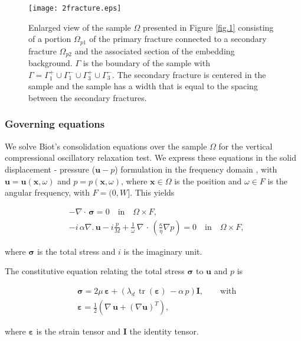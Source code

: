 \documentclass[draft]{agujournal2019}
\DeclareMathOperator{\tr}{tr}
\begin{document}
 \begin{figure}[!ht]
\centering
        \texttt{[image: 2fracture.eps]}
\caption{ Enlarged view of the sample $\Omega$ presented in Figure \ref{fig.1} consisting of a portion $\Omega_{p1}$ of the primary fracture connected to a secondary fracture $\Omega_{p2}$ and the associated section of the embedding background. $\Gamma$ is the boundary of the sample with $\Gamma = \Gamma_1^+ \cup \Gamma_1^- \cup \Gamma_3^+ \cup \Gamma_3^- $. The secondary fracture is centered in the sample and the sample has a width that is equal to the spacing between the secondary fractures.
}
\label{fig.2}
\end{figure}

\subsubsection{Governing equations}

We solve Biot's consolidation equations \cite{Biot1941} over the sample $\Omega$  for the vertical compressional oscillatory relaxation test. 
We express these equations in the solid displacement - pressure ($\bm{u}-p$) formulation in the frequency domain \cite{Quintal2011,Favino2020},  with $\bm{u} = \bm{u}(\bm{x}, \omega)$ and $p = p(\bm{x},\omega)$, where $\bm{x} \in \Omega$ is the position  and $\omega \in F$ is the angular frequency, with $F =(0,W]$. This yields
\begin{linenomath*}
\begin{equation}\label{Eq.6}
\begin{split}
& - \nabla \cdot \, \bm{\sigma} =0  \quad  \textrm{in} \quad \Omega \times F,  \\
& - i \, \alpha \nabla . \, \bm{u} -i \frac{p}{M} + \frac{1}{\omega} \,\nabla \, \cdot \, \left( \frac{\kappa}{\eta} \nabla p\right)  =0 \quad  \textrm{in} \quad \Omega \times F,
\end{split}
\end{equation}
\end{linenomath*}
where $\bm{\sigma}$ is the total stress and $i$ is the imaginary unit.

The constitutive equation relating the total stress $\bm{\sigma}$ to $\bm{u}$ and $p$ is
\begin{linenomath*}
\begin{equation}\label{Eq.7}
\begin{split}
& \bm{\sigma} =  2\mu \, \bm{\varepsilon} +  \left( \lambda_d \,  \tr( \bm{\varepsilon})\, - \alpha \,p \right) \bm{I}, \qquad \text{with}\\
& \bm{\varepsilon} = \frac{1}{2} \left( \nabla \,\bm{u} + ({\nabla  \bm{u}})^T  \right),
\end{split}
\end{equation}
\end{linenomath*}
where $\bm{\varepsilon}$ is the strain tensor and $\bm{I}$ the identity tensor. 
\end{document}
